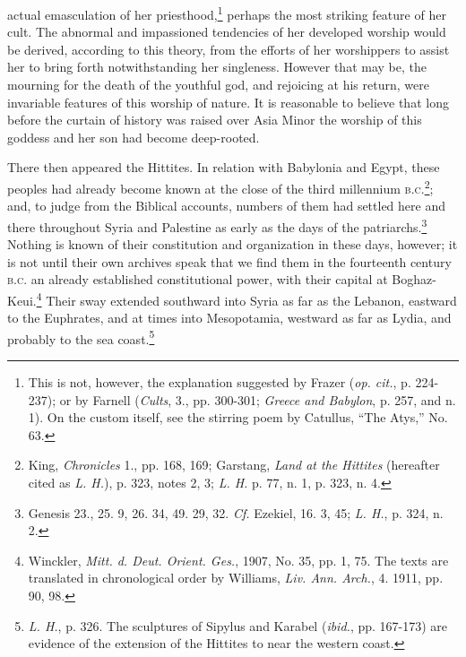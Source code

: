 \documentclass[a4paper, 11pt, oneside, polutonikogreek, english]{article}
\begin{document}
actual emasculation of her priesthood,\footnote{This is not, however, the explanation suggested by Frazer (\emph{op. cit.}, p. 224-237); or by Farnell (\emph{Cults}, 3., pp. 300-301; \emph{Greece and Babylon}, p. 257, and n. 1). On the custom itself, see the stirring poem by Catullus, ``The Atys,'' No. 63.} perhaps the most striking feature of her cult. The abnormal and impassioned tendencies of her developed worship would be derived, according to this theory, from the efforts of her worshippers to assist her to bring forth notwithstanding her singleness. However that may be, the mourning for the death of the youthful god, and rejoicing at his return, were invariable features of this worship of nature. It is reasonable to believe that long before the curtain of history was raised over Asia Minor the worship of this goddess and her son had become deep-rooted.

There then appeared the Hittites. In relation with Babylonia and Egypt, these peoples had already become known at the close of the third millennium \textsc{b.c.}\footnote{King, \emph{Chronicles} 1., pp. 168, 169; Garstang, \emph{Land at the Hittites} (hereafter cited as \emph{L. H.}), p. 323, notes 2, 3; \emph{L. H.} p. 77, n. 1, p. 323, n. 4.}; and, to judge from the Biblical accounts, numbers of them had settled here and there throughout Syria and Palestine as early as the days of the patriarchs.\footnote{Genesis 23., 25. 9, 26. 34, 49. 29, 32. \emph{Cf.} Ezekiel, 16. 3, 45; \emph{L. H.}, p. 324, n. 2.} Nothing is known of their constitution and organization in these days, however; it is not until their own archives speak that we find them in the fourteenth century \textsc{b.c.} an already established constitutional power, with their capital at Boghaz-Keui.\footnote{Winckler, \emph{Mitt. d. Deut. Orient. Ges.}, 1907, No. 35, pp. 1, 75. The texts are translated in chronological order by Williams, \emph{Liv. Ann. Arch.}, 4. 1911, pp. 90, 98.} Their sway extended southward into Syria as far as the Lebanon, eastward to the Euphrates, and at times into Mesopotamia, westward as far as Lydia, and probably to the sea coast.\footnote{\emph{L. H.}, p. 326. The sculptures of Sipylus and Karabel (\emph{ibid.}, pp. 167-173) are evidence of the extension of the Hittites to near the western coast.}
\end{document}
